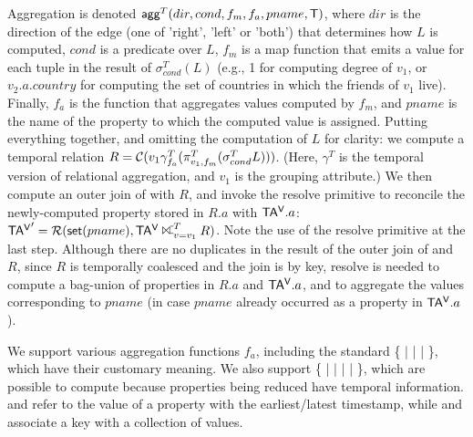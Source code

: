 Aggregation is denoted $\textsf{agg}^T(dir,cond,f_m,f_a,pname,\mathsf{T})$,
where $dir$ is the direction of the edge (one of 'right', 'left' or
'both') that determines how $L$ is computed, $cond$ is a predicate
over $L$, $f_m$ is a map function that emits a value for each tuple in
the result of $\sigma^T_{cond}(L)$ (e.g., 1 for computing degree of
$v_1$, or $v_2.a.country$ for computing the set of countries in which
the friends of $v_1$ live).  Finally, $f_a$ is the function that
aggregates values computed by $f_m$, and $pname$ is the name of the
property to which the computed value is assigned.  Putting everything
together, and omitting the computation of $L$ for clarity: we compute
a temporal relation $R = \mathcal{C}(v_1 \gamma^T_{f_a} (\pi^T_{v_1,f_m}
  (\sigma^T_{cond} L)))$. (Here, $\gamma^T$ is the temporal version of
relational aggregation, and $v_1$ is the grouping attribute.)  We then
compute an outer join of \tav with $R$, and invoke the resolve
primitive to reconcile the newly-computed property stored in $R.a$
with $\mathsf{TA^{V}}.a$: $\tav' = \resolve{\insql{set}(pname)}{\tav
  \rightouterjoin^T_{v=v_1} R}$. Note the use of the resolve primitive
at the last step.  Although there are no duplicates in the result of
the outer join of \tav and $R$, since $R$ is temporally coalesced and
the join is by key, resolve is needed to compute a bag-union of
properties in $R.a$ and $\mathsf{TA^{V}}.a$, and to aggregate the values
corresponding to $pname$ (in case $pname$ already occurred as a
property in $\mathsf{TA^{V}}.a$).


We support various aggregation functions $f_a$, including the standard
\{  |  |  |  \}, which
have their customary meaning.  We also support \{  |
 |  |  |  \}, which
are possible to compute because properties being reduced have temporal
information.   and  refer to the value of a
property with the earliest/latest timestamp, while  and
 associate a key with a collection of values.

